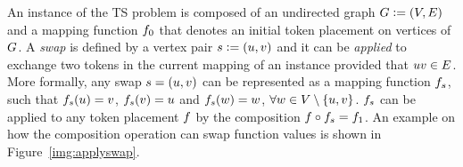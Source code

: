 \documentclass[msc,english,table,xcdraw]{ppgccufmg}
\begin{document}
An instance of the TS problem is composed of an undirected graph $G \vcentcolon= (V,E)$ and a mapping function $f_{0}$ that denotes an initial 
token placement on vertices of $G$.
A \textit{swap} is defined by a vertex pair $s \vcentcolon= (u,
v)$ and it can be \textit{applied} to exchange two tokens in the current 
mapping of an instance provided that $uv \in E$.
More formally, any swap $s = (u,v)$ can be 
represented as a mapping function $f_s$, such that $f_s(u) = v$, $f_s(v) = u$ and $f_s(w) = w$, $\forall w \in V\setminus \{u,v\}$. $f_s$ can be
applied to any token placement $f$ by the composition $f \circ f_s
  = f_1$.
An example on how the composition operation can swap function values is shown
in Figure~\ref{img:applyswap}.

\end{document}

